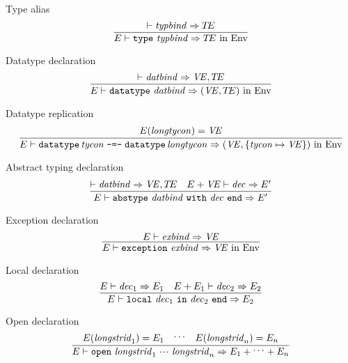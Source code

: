 \begin{inference-rule}{Type alias}
\begin{equation}\label{rule:dynamic-core:type-alias}
\vcenter{\infer{\E\ts\typedec\ra\TE\ \In\ \Env}
  {\ts\typbind\ra\TE}}
\end{equation}
\end{inference-rule}

\begin{inference-rule}{Datatype declaration}
\begin{equation}\label{rule:dynamic-core:}
\vcenter{\infer{\E\ts\datatypedec\ra(\VE,\TE)\ \In\ \Env}
  {\ts\datbind\ra\VE,\TE}}
\end{equation}
\end{inference-rule}

\begin{inference-rule}{Datatype replication}
\begin{equation}\label{rule:dynamic-core:}
\vcenter{\infer{
    \E\ts\datatyperepldec\ra
    (\VE,\{\tycon\mapsto\VE\})\ \In\ \Env
  }
  {\E(\longtycon) = \VE}}
\end{equation}
\end{inference-rule}

\begin{inference-rule}{Abstract typing declaration}
\begin{equation}\label{rule:dynamic-core:abstype}
\vcenter{\infer{\E\ts\abstypedec \ra \E'}
  {\ts\datbind\ra\VE,\TE
    & \E+\VE\ts\dec\ra \E'}}
\end{equation}
\end{inference-rule}

\begin{inference-rule}{Exception declaration}
\begin{equation}\label{rule:dynamic-core:exception-declaration}
\vcenter{\infer{\E\ts\exceptiondec\ra\VE\ \In\ \Env }
  {\E\ts\exnbind\ra\VE }}
\end{equation}
\end{inference-rule}

\begin{inference-rule}{Local declaration}
\begin{equation}\label{rule:dynamic-core:local-declaration}
\vcenter{\infer{\E\ts\localdec\ra\E_{2}}
  {\E\ts\dec_{1}\ra\E_{1}
    & \E+\E_{1}\ts\dec_{2}\ra\E_{2}}}
\end{equation}
\end{inference-rule}

\begin{inference-rule}{Open declaration}
\begin{equation}\label{rule:dynamic-core:open-declaration}
\vcenter{\infer{ \E\ts\openstrdec\ra \E_{1} + \syndots + \E_{n} }
  { \E(\longstrid_{1})=\E_{1}
    &\syndots
    &\E(\longstrid_{n})=\E_{n} }}
\end{equation}
\end{inference-rule}

